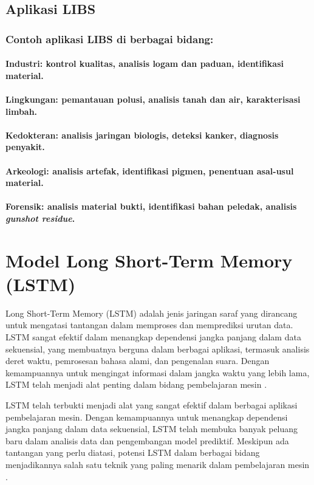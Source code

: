 \subsection{Aplikasi LIBS}

\subsubsection{Contoh aplikasi LIBS di berbagai bidang:}

\paragraph{Industri: kontrol kualitas, analisis logam dan paduan, identifikasi material.}
\paragraph{Lingkungan: pemantauan polusi, analisis tanah dan air, karakterisasi limbah.}
\paragraph{Kedokteran: analisis jaringan biologis, deteksi kanker, diagnosis penyakit.}
\paragraph{Arkeologi: analisis artefak, identifikasi pigmen, penentuan asal-usul material.}
\paragraph{Forensik: analisis material bukti, identifikasi bahan peledak, analisis \textit{gunshot residue}.}
\section{Model Long Short-Term Memory (LSTM)}
\par Long Short-Term Memory (LSTM) adalah jenis jaringan saraf yang dirancang untuk mengatasi tantangan dalam memproses dan memprediksi urutan data. LSTM sangat efektif dalam menangkap dependensi jangka panjang dalam data sekuensial, yang membuatnya berguna dalam berbagai aplikasi, termasuk analisis deret waktu, pemrosesan bahasa alami, dan pengenalan suara. Dengan kemampuannya untuk mengingat informasi dalam jangka waktu yang lebih lama, LSTM telah menjadi alat penting dalam bidang pembelajaran mesin \citep{hochreiter1997}.
\par LSTM telah terbukti menjadi alat yang sangat efektif dalam berbagai aplikasi pembelajaran mesin. Dengan kemampuannya untuk menangkap dependensi jangka panjang dalam data sekuensial, LSTM telah membuka banyak peluang baru dalam analisis data dan pengembangan model prediktif. Meskipun ada tantangan yang perlu diatasi, potensi LSTM dalam berbagai bidang menjadikannya salah satu teknik yang paling menarik dalam pembelajaran mesin \citep{graves2013}.

